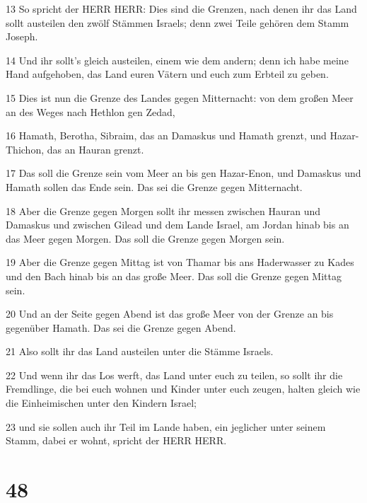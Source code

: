 \par 13 So spricht der HERR HERR: Dies sind die Grenzen, nach denen ihr das Land sollt austeilen den zwölf Stämmen Israels; denn zwei Teile gehören dem Stamm Joseph.
\par 14 Und ihr sollt's gleich austeilen, einem wie dem andern; denn ich habe meine Hand aufgehoben, das Land euren Vätern und euch zum Erbteil zu geben.
\par 15 Dies ist nun die Grenze des Landes gegen Mitternacht: von dem großen Meer an des Weges nach Hethlon gen Zedad,
\par 16 Hamath, Berotha, Sibraim, das an Damaskus und Hamath grenzt, und Hazar-Thichon, das an Hauran grenzt.
\par 17 Das soll die Grenze sein vom Meer an bis gen Hazar-Enon, und Damaskus und Hamath sollen das Ende sein. Das sei die Grenze gegen Mitternacht.
\par 18 Aber die Grenze gegen Morgen sollt ihr messen zwischen Hauran und Damaskus und zwischen Gilead und dem Lande Israel, am Jordan hinab bis an das Meer gegen Morgen. Das soll die Grenze gegen Morgen sein.
\par 19 Aber die Grenze gegen Mittag ist von Thamar bis ans Haderwasser zu Kades und den Bach hinab bis an das große Meer. Das soll die Grenze gegen Mittag sein.
\par 20 Und an der Seite gegen Abend ist das große Meer von der Grenze an bis gegenüber Hamath. Das sei die Grenze gegen Abend.
\par 21 Also sollt ihr das Land austeilen unter die Stämme Israels.
\par 22 Und wenn ihr das Los werft, das Land unter euch zu teilen, so sollt ihr die Fremdlinge, die bei euch wohnen und Kinder unter euch zeugen, halten gleich wie die Einheimischen unter den Kindern Israel;
\par 23 und sie sollen auch ihr Teil im Lande haben, ein jeglicher unter seinem Stamm, dabei er wohnt, spricht der HERR HERR.

\chapter{48}

